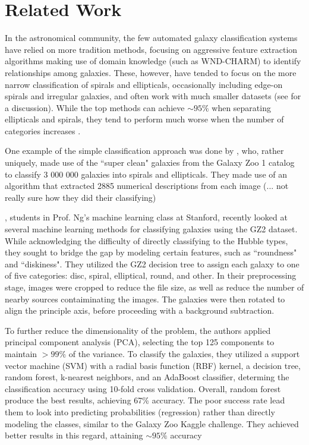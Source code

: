 \documentclass[twocolumn]{aastex6}
\begin{document}
\section{Related Work}
In the astronomical community, the few automated galaxy classification systems have relied on more tradition methods, focusing on aggressive feature extraction algorithms making use of domain knowledge (such as WND-CHARM) to identify relationships among galaxies. These, however, have tended to focus on the more narrow classification of spirals and ellipticals, occasionally including edge-on spirals and irregular galaxies, and often work with much smaller datasets (see \citealt{2015MNRAS.450.1441D} for a discussion). While the top methods can achieve $\sim95\%$ when separating ellipticals and spirals, they tend to perform much worse when the number of categories increases \citep{2004MNRAS.349...87D}.

One example of the simple classification approach was done by \cite{2016ApJS..223...20K}, who, rather uniquely, made use of the ``super clean" galaxies from the Galaxy Zoo 1 catalog \citep{2008MNRAS.389.1179L} to classify 3 000 000 galaxies into spirals and ellipticals. They made use of an algorithm that extracted 2885 numerical descriptions from each image (... not really sure how they did their classifying)

\cite{stanford}, students in Prof. Ng's machine learning class at Stanford, recently looked at several machine learning methods for classifying galaxies using the GZ2 dataset. While acknowledging the difficulty of directly classifying to the Hubble types, they sought to bridge the gap by modeling certain features, such as ``roundness" and ``diskiness". They utilized the GZ2 decision tree to assign each galaxy to one of five categories: disc, spiral, elliptical, round, and other. In their preprocessing stage, images were cropped to reduce the file size, as well as reduce the number of nearby sources contaiminating the images. The galaxies were then rotated to align the principle axis, before proceeding with a background subtraction.

To further reduce the dimensionality of the problem, the authors applied principal component analysis (PCA), selecting the top 125 components to maintain $>99\%$ of the variance. To classify the galaxies, they utilized a support vector machine (SVM) with a radial basis function (RBF) kernel, a decision tree, random forest, k-nearest neighbors, and an AdaBoost classifier, determing the classification accuracy using 10-fold cross validation. Overall, random forest produce the best results, achieving 67\% accuracy. The poor success rate lead them to look into predicting probabilities (regression) rather than directly modeling the classes, similar to the Galaxy Zoo Kaggle challenge. They achieved better results in this regard, attaining $\sim 95\%$ accuracy
\end{document}
